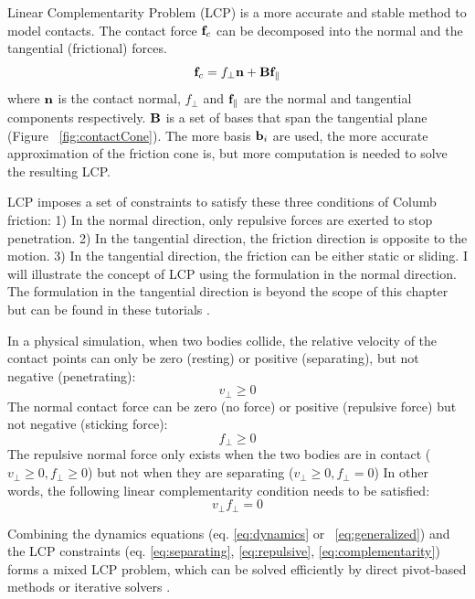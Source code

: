 Linear Complementarity Problem (LCP) is a more accurate and stable method to model contacts. The contact force $\mathbf{f}_c$ can be decomposed into the normal and the tangential (frictional) forces.
\begin{displaymath}
\mathbf{f}_c = f_\perp\mathbf{n}+\mathbf{B}\mathbf{f}_{\parallel}
\end{displaymath}
where $\mathbf{n}$ is the contact normal, $f_\perp$ and $\mathbf{f}_{\parallel}$ are the normal and tangential components respectively. $\mathbf{B}$ is a set of bases that span the tangential plane (Figure ~\ref{fig:contactCone}). The more basis $\mathbf{b}_i$ are used, the more accurate approximation of the friction cone is, but more computation is needed to solve the resulting LCP. 

LCP imposes a set of constraints to satisfy these three conditions of Columb friction: 1) In the normal direction, only repulsive forces are exerted to stop penetration. 2) In the tangential direction, the friction direction is opposite to the motion. 3) In the tangential direction, the friction can be either static or sliding. I will illustrate the concept of LCP using the formulation in the normal direction. The formulation in the tangential direction is beyond the scope of this chapter but can be found in these tutorials \cite{Lloyd:2005,Tan:2012b}. 

In a physical simulation, when two bodies collide, the relative velocity of the contact points can only be zero (resting) or positive (separating), but not negative (penetrating):
\begin{equation}
v_\perp\geq 0
\label{eq:separating}
\end{equation}
The normal contact force can be zero (no force) or positive (repulsive force) but not negative (sticking force):
\begin{equation}
f_\perp \geq 0
\label{eq:repulsive}
\end{equation}
The repulsive normal force only exists when the two bodies are in contact ($v_\perp\geq 0, f_\perp\geq 0$)
but not when they are separating ($v_\perp \geq 0, f_\perp =0$)
In other words, the following linear complementarity condition needs to be satisfied:
\begin{equation}
v_\perp f_\perp =0
\label{eq:complementarity}
\end{equation}

Combining the dynamics equations (eq. \ref{eq:dynamics} or ~\ref{eq:generalized}) and the LCP constraints (eq. \ref{eq:separating}, \ref{eq:repulsive}, \ref{eq:complementarity}) forms a mixed LCP problem, which can be solved efficiently by direct pivot-based methods \cite{Lloyd05} or iterative solvers \cite{Erleben:2007,Kaufman:2008,Otaduy:2009}. 


